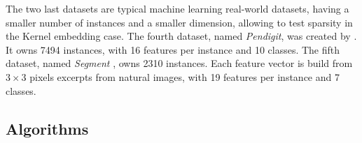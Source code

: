 \documentclass[preprint,12pt,authoryear]{elsarticle}
\begin{document}

The two last datasets are typical machine learning real-world datasets, having a smaller number of instances and a smaller dimension, allowing to test sparsity in the Kernel embedding case.   
The fourth dataset, named \textit{Pendigit}, was created by \cite{alimoglu1996combining}. It owns 7494 instances, with 16 features per instance and 10 classes. 
The fifth dataset, named  \textit{Segment} \cite{Lichman:2013}, owns 2310 instances. Each feature vector is build from $3\times3$ pixels excerpts from natural images, with 19 features per instance and 7 classes. 



\subsection{Algorithms}
\end{document}
